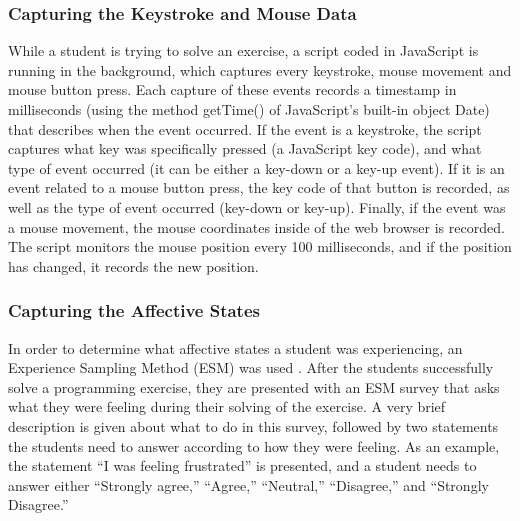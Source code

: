 \documentclass[runningheads,a4paper]{llncs}
\begin{document}
\FloatBarrier

\subsubsection{Capturing the Keystroke and Mouse Data}

While a student is trying to solve an exercise, a script coded in JavaScript is running in the background, which captures every keystroke, mouse movement and mouse button press. Each capture of these events records a timestamp in milliseconds (using the method getTime() of JavaScript's built-in object Date) that describes when the event occurred. If the event is a keystroke, the script captures what key was specifically pressed (a JavaScript key code), and what type of event occurred (it can be either a key-down or a key-up event). If it is an event related to a mouse button press, the key code of that button is recorded, as well as the type of event occurred (key-down or key-up). Finally, if the event was a mouse movement, the mouse coordinates inside of the web browser is recorded. The script monitors the mouse position every 100 milliseconds, and if the position has changed, it records the new position.

\subsubsection{Capturing the Affective States}

In order to determine what affective states a student was experiencing, an Experience Sampling Method (ESM) was used \cite{esm}. After the students successfully solve a programming exercise, they are presented with an ESM survey that asks what they were feeling during their solving of the exercise. A very brief description is given about what to do in this survey, followed by two statements the students need to answer according to how they were feeling. As an example, the statement ``I was feeling frustrated'' is presented, and a student needs to answer either ``Strongly agree,'' ``Agree,'' ``Neutral,'' ``Disagree,'' and ``Strongly Disagree.'' %


\end{document}
